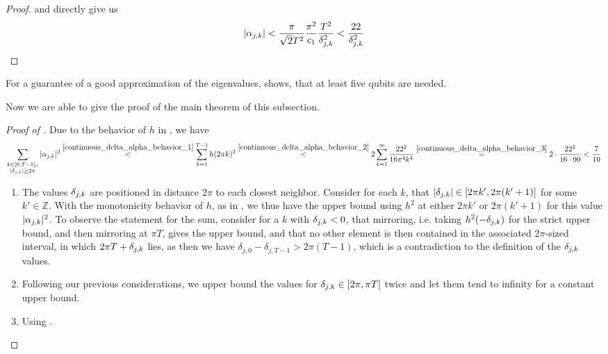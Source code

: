 \begin{proof}
     and  directly give us
    \begin{align}
        |\alpha_{j, k}| < \frac{\pi}{\sqrt{2}T^2} \frac{\pi^2}{c_1} \frac{T^2}{\delta_{j, k}^2} < \frac{22}{\delta_{j, k}^2}
    \end{align}
\end{proof}

\begin{remark}
    For a guarantee of a good approximation of the eigenvalues,  shows, that at least five qubits are needed.
\end{remark}

Now we are able to give the proof of the main theorem of this subsection.

\begin{proof}[Proof of ]
    Due to the behavior of \(h\) in , we have
    \begin{align}
        \sum_{\substack{k \in [0, T-1]_{\mathbb{N}}\\|\delta_{j, k}| \geq 2\pi}} |\alpha_{j, k}|^2 \overset{\ref{continuous_delta_alpha_behavior_1}}{<} \sum_{k=1}^{T-1} h(2 \pi k)^2 \overset{\ref{continuous_delta_alpha_behavior_2}}{<} 2\sum_{k=1}^\infty \frac{22^2}{16\pi^4k^4} \overset{\ref{continuous_delta_alpha_behavior_3}}{=} 2 \cdot \frac{22^2}{16 \cdot 90} < \frac{7}{10}
    \end{align}
    \begin{enumerate}[label=(\arabic*), wide]
        \item \label{continuous_delta_alpha_behavior_1} The values \(\delta_{j, k}\) are positioned in distance \(2\pi\) to each closest neighbor. Consider for each \(k\), that \(|\delta_{j, k}| \in [2 \pi k', 2 \pi (k'+1)]\) for some \(k' \in \mathbb{Z}\). With the monotonicity behavior of \(h\), as in , we thus have the upper bound using \(h^2\) at either \(2 \pi k'\) or \(2 \pi (k'+1)\) for this value \(|\alpha_{j, k}|^2\). To observe the statement for the sum, consider for a \(k\) with \(\delta_{j, k} < 0\), that mirroring, i.e. taking \(h^2(-\delta_{j, k})\) for the strict upper bound, and then mirroring at \(\pi T\), gives the upper bound, and that no other element is then contained in the associated \(2 \pi\)-sized interval, in which \(2 \pi T + \delta_{j, k}\) lies, as then we have \(\delta_{j, 0} - \delta_{j, T-1} > 2 \pi (T-1)\), which is a contradiction to the definition of the \(\delta_{j, k}\) values.
        \item \label{continuous_delta_alpha_behavior_2} Following our previous considerations, we upper bound the values for \(\delta_{j, k} \in [2\pi, \pi T]\) twice and let them tend to infinity for a constant upper bound.
        \item \label{continuous_delta_alpha_behavior_3} Using .
    \end{enumerate}
\end{proof}

